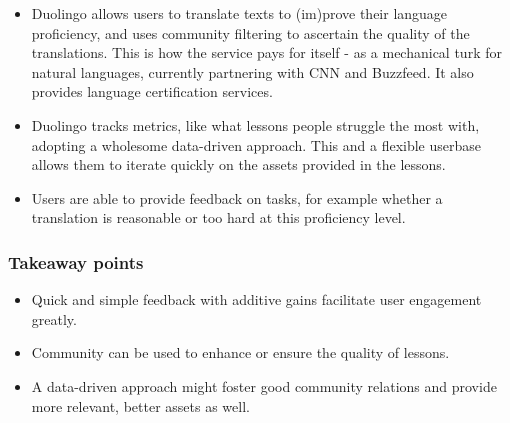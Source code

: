 \begin{itemize}
\item Duolingo allows users to translate texts to (im)prove their language
  proficiency, and uses community filtering to ascertain the quality of the
  translations. This is how the service pays for itself - as a mechanical turk
  for natural languages, currently partnering with CNN and
  Buzzfeed.\cite{duolingobuzz} It also provides language certification
  services.\cite{duolingocert}
\item Duolingo tracks metrics, like what lessons people struggle the most 
  with, adopting a wholesome data-driven approach. This and a flexible 
  userbase allows them to iterate quickly on the assets provided in the
  lessons.\cite{duolingodatadriven}
\item Users are able to provide feedback on tasks, for example whether a translation
  is reasonable or too hard at this proficiency level.
\end{itemize}

\subsubsection{Takeaway points}

\begin{itemize}
\item Quick and simple feedback with additive gains facilitate user engagement
  greatly.
\item Community can be used to enhance or ensure the quality of lessons.
\item A data-driven approach might foster good community relations and provide more
  relevant, better assets as well.
\end{itemize}
